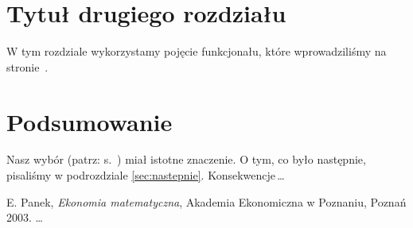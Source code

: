 \documentclass[11pt,a4paper]{report}
\begin{document}
 \chapter{Tytuł drugiego rozdziału}
 W tym rozdziale wykorzystamy pojęcie funkcjonału, które
 wprowadziliśmy na stronie~\pageref{poj:funkcjonal}.

 \chapter*{Podsumowanie}

 Nasz wybór (patrz: s.~\pageref{sec:wybor}) miał istotne znaczenie.
 O tym, co było następnie, pisaliśmy w podrozdziale \ref{sec:nastepnie}.
 Konsekwencje\,\ldots

 \begin{thebibliography}{9}
 E. Panek, \emph{Ekonomia matematyczna}, Akademia Ekonomiczna w Poznaniu,
 Poznań 2003.
 \ldots
 \end{thebibliography}

 
\end{document}
